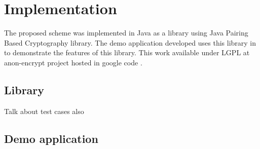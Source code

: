 \section{Implementation}
The proposed scheme was implemented in Java as a library using Java Pairing Based Cryptography \cite{jpbc} library. The demo application developed uses this library in to demonstrate the features of this library. This work available under LGPL at anon-encrypt project hosted in google code \cite{ae}.

\subsection{Library}
Talk about test cases also

\subsection{Demo application}


